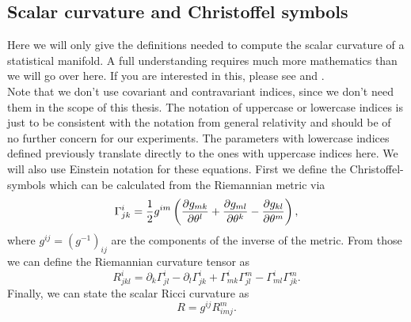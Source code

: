 \subsection{Scalar curvature and Christoffel symbols}
Here we will only give the definitions needed to compute the scalar curvature of a statistical manifold. A full understanding requires much more mathematics than we will go over here. If you are interested in this, please see \cite{AmarisLectureNotes} and \cite{GeneralRelativityBook}.\\
Note that we don't use covariant and contravariant indices, since we don't need them in the scope of this thesis. The notation of uppercase or lowercase indices is just to be consistent with the notation from general relativity and should be of no further concern for our experiments. The parameters with lowercase indices defined previously translate directly to the ones with uppercase indices here. We will also use Einstein notation for these equations. First we define the Christoffel-symbols which can be calculated from the Riemannian metric via
\begin{equation}
	\Gamma^{i}_{jk} = \frac{1}{2}g^{im} \left(\frac{\partial g_{mk}}{\partial\theta^l} + \frac{\partial g_{ml}}{\partial\theta^k} - \frac{\partial g_{kl}}{\partial\theta^m}\right),
\end{equation} 
where $g^{ij} = (g^{-1})_{ij}$ are the components of the inverse of the metric.
From those we can define the Riemannian curvature tensor as 
\begin{equation}
	R^{i}_{jkl} = \partial_k \Gamma^i_{jl} - \partial_l \Gamma^i_{jk} + \Gamma^i_{mk}\Gamma^m_{jl} - \Gamma^i_{ml}\Gamma^m_{jk}.
\end{equation}
Finally, we can state the scalar Ricci curvature as 
\begin{equation}
	R = g^{ij} R^m_{imj}.
\end{equation}

